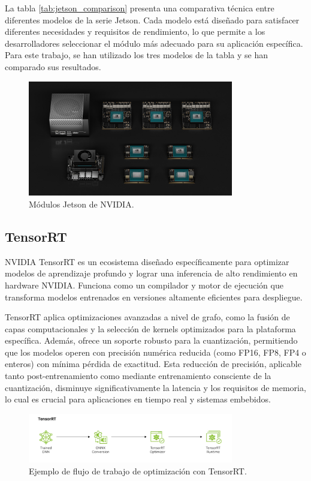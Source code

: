\documentclass[11pt,spanish,listoffigures,listoftables]{tfgetsinf}
\begin{document}
La tabla \ref{tab:jetson_comparison}\cite{nvidia_jetson_modules} presenta una comparativa técnica entre diferentes modelos de la serie Jetson. Cada modelo está diseñado para satisfacer diferentes necesidades y requisitos de rendimiento, lo que permite a los desarrolladores seleccionar el módulo más adecuado para su aplicación específica. Para este trabajo, se han utilizado los tres modelos de la tabla y se han comparado sus resultados.

\begin{figure}[H]
   \centering
   \includegraphics[width=0.8\textwidth]{images/estado_del_arte/jetson_family.png}
   \caption{Módulos Jetson de NVIDIA.}
   \label{fig:jetson_modules}
\end{figure}

\subsection{TensorRT}
NVIDIA TensorRT es un ecosistema diseñado específicamente para optimizar modelos de aprendizaje profundo y lograr una inferencia de alto rendimiento en hardware NVIDIA. Funciona como un compilador y motor de ejecución que transforma modelos entrenados en versiones altamente eficientes para despliegue.

TensorRT aplica optimizaciones avanzadas a nivel de grafo, como la fusión de capas computacionales y la selección de kernels optimizados para la plataforma específica. Además, ofrece un soporte robusto para la cuantización, permitiendo que los modelos operen con precisión numérica reducida (como FP16, FP8, FP4 o enteros) con mínima pérdida de exactitud. Esta reducción de precisión, aplicable tanto post-entrenamiento como mediante entrenamiento consciente de la cuantización, disminuye significativamente la latencia y los requisitos de memoria, lo cual es crucial para aplicaciones en tiempo real y sistemas embebidos.

\begin{figure}[H]
   \centering
   \includegraphics[width=0.8\textwidth]{images/estado_del_arte/TensorRT_pipeline.png}
   \caption{Ejemplo de flujo de trabajo de optimización con TensorRT.}
   \label{fig:tensorrt_architecture}
\end{figure}
\end{document}
